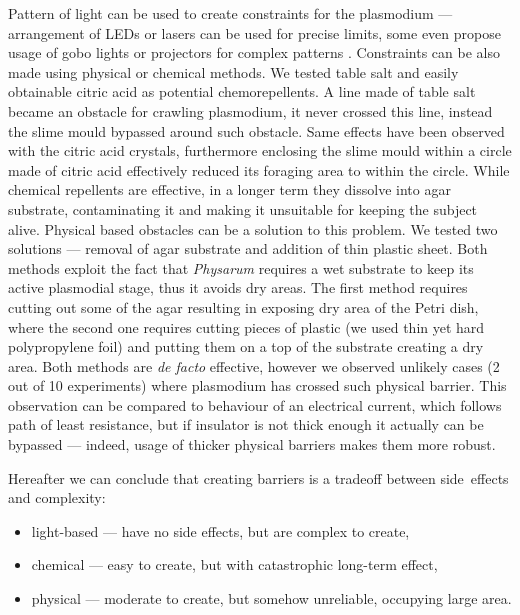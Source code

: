 \documentclass[english,a4paper,twoside]{ppfcmthesis}
\begin{document}
Pattern of light can be used to create constraints for the plasmodium --- arrangement of LEDs or lasers can be used for precise limits, some even propose usage of gobo lights or projectors for complex patterns \cite{zhu2013amoeba}. Constraints can be also made using physical or chemical methods. We tested table salt and easily obtainable citric acid as potential chemorepellents. A line made of table salt became an obstacle for crawling plasmodium, it never crossed this line, instead the slime mould bypassed around such obstacle. Same effects have been observed with the citric acid crystals, furthermore enclosing the slime mould within a circle made of citric acid effectively reduced its foraging area to within the circle. While chemical repellents are effective, in a longer term they dissolve into agar substrate, contaminating it and making it unsuitable for keeping the subject alive. Physical based obstacles can be a solution to this problem. We tested two solutions --- removal of agar substrate and addition of thin plastic sheet. Both methods exploit the fact that \textit{Physarum} requires a wet substrate to keep its active plasmodial stage, thus it avoids dry areas. The first method requires cutting out some of the agar resulting in exposing dry area of the Petri dish, where the second one requires cutting pieces of plastic (we used thin yet hard polypropylene foil) and putting them on a top of the substrate creating a dry area. Both methods are \textit{de facto} effective, however we observed unlikely cases (2 out of 10 experiments) where plasmodium has crossed such physical barrier. This observation can be compared to behaviour of an electrical current, which follows path of least resistance, but if insulator is not thick enough it actually can be bypassed --- indeed, usage of thicker physical barriers makes them more robust. 

Hereafter we can conclude that creating barriers is a tradeoff between side~effects and complexity:
\begin{itemize}
  \item light-based --- have no side effects, but are complex to create,
  \item chemical --- easy to create, but with catastrophic long-term effect,
  \item physical --- moderate to create, but somehow unreliable, occupying large area.
\end{itemize}
\end{document}
